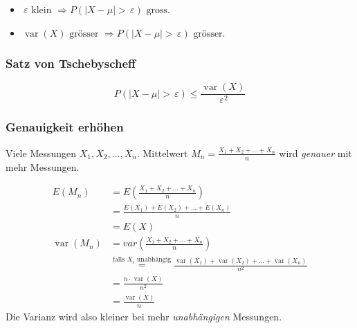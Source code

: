 \documentclass[10pt,a4paper]{scrartcl}
\newif\ifincludeExamples
\DeclareMathOperator{\var}{var}
\begin{document}
\begin{itemize}
\item $\,\varepsilon \text{ klein } \Rightarrow P (|X-\mu| > \,\varepsilon) \text{ gross}$.
\item $\var(X) \text{ grösser } \Rightarrow P (|X-\mu| > \,\varepsilon) \text{ grösser}$.
\end{itemize}

\subsubsection{Satz von Tschebyscheff}
 $$P (|X-\mu| > \,\varepsilon) \le \frac{\var(X)}{\,\varepsilon^2}$$
\ifincludeExamples
\subsubsection{Beweis}
\begin{align*}
\text{Ereignis } A &= \{ |X-\mu| > \,\varepsilon \} \\
\text{besondere ZV: } \chi_A & = \begin{cases}1 & \quad A \text{ eingetreten} \\ 
                                              0 & \quad \text{sonst}
                                 \end{cases} & \text{logischerweise: } \chi^2 = \chi\\
E(\chi_A) & = 0\cdot P(\chi_A = 0) + 1\cdot P(\chi_A = 1) = P(A) \\
\varepsilon &\le |X - \mu| & \text{gilt falls } A \text{ eingetreten} \\
\varepsilon \chi_A &\le |X-\mu| & ()^2 \text{ statt Betrag} \\
\varepsilon^2\chi_A^{\cancel{2}} &\le (X-\mu)^2 & |\ E(\ .\ ) \\
\varepsilon^2P(A) = \,\varepsilon^2E(\chi_A)&\le E((X-E(X))^2) = \var(X) \\
\varepsilon^2P(|X-\mu|>\,\varepsilon) & \le \var(X)
\end{align*}
\fi

\subsubsection{Genauigkeit erhöhen}
Viele Messungen $X_1, X_2, \dots, X_n$. $ \text{Mittelwert } M_n = \frac{X_1+ X_2+ \dots + X_n}{n}$ wird \emph{genauer} mit mehr Messungen.

\begin{align*}
E(M_n) & = E\left( \frac{X_1+ X_2+ \dots + X_n}{n}\right)  \\
& = \frac{E(X_1) + E(X_2) + \dots + E(X_n)}{n} \\
& = E(X) \\
\var(M_n) &= var\left(\frac{X_1+ X_2+ \dots + X_n}{n}\right) \\
&\stackrel{\text{falls }X_i\text{ unabhängig}}{=} \frac{\var(X_1)+ \var(X_2)+ \dots + \var(X_n)}{n^2} \\ %
& = \frac{n\cdot \var(X)}{n^2} \\
& = \frac{\var(X)}{n}
\end{align*}
Die Varianz wird also kleiner bei mehr \emph{unabhängigen} Messungen.
\end{document}

